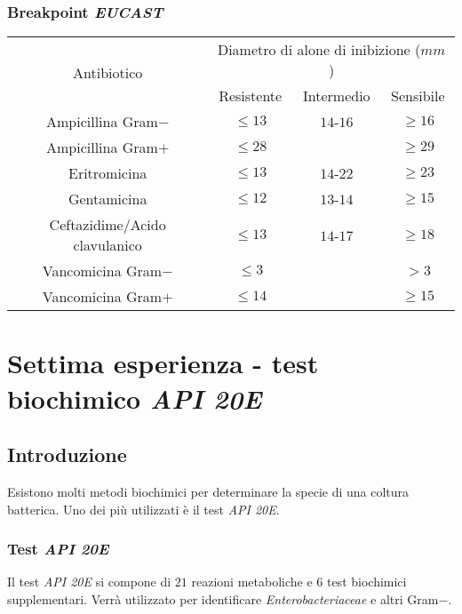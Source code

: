 		\subsubsection{Breakpoint \emph{EUCAST}}
		\begin{center}
			\begin{tabular}{|c|c|c|c|}
				\hline
				\multirow{2}{*}{Antibiotico} & \multicolumn{3}{c|}{Diametro di alone di inibizione ($\si{mm}$)} \\
				\cline{2-4}
							     & Resistente & Intermedio & Sensibile \\
				\hline
				Ampicillina Gram$-$ & $\le 13$ & $14$-$16$ & $\ge 16$ \\
				\hline
				Ampicillina Gram$+$ & $\le 28$ & & $\ge 29$ \\
				\hline
				Eritromicina & $\le 13$ & $14$-$22$ & $\ge 23$ \\
				\hline
				Gentamicina & $\le 12$ & $13$-$14$ & $\ge 15$ \\
				\hline
				Ceftazidime/Acido clavulanico & $\le 13$ & $14$-$17$ & $\ge 18$ \\
				\hline
				Vancomicina Gram$-$ & $\le 3$ & & $> 3$ \\
				\hline
				Vancomicina Gram$+$ & $\le 14$ & & $\ge 15$ \\
				\hline
			\end{tabular}
		\end{center}
\section{Settima esperienza - test biochimico \emph{API 20E}}

	\subsection{Introduzione}
	Esistono molti metodi biochimici per determinare la specie di una coltura batterica.
	Uno dei pi\`u utilizzati \`e il test \emph{API 20E}.

		\subsubsection{Test \emph{API 20E}}
		Il test \emph{API 20E} si compone di $21$ reazioni metaboliche e $6$ test biochimici supplementari.
		Verr\`a utilizzato per identificare \emph{Enterobacteriaceae} e altri Gram$-$.

